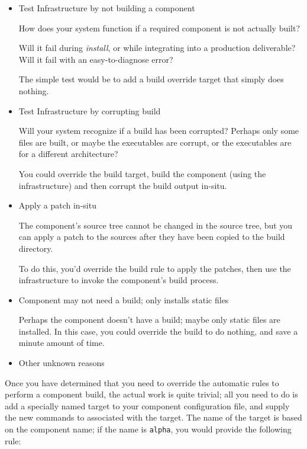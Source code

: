 \begin{itemize}
\item Test \bni Infrastructure by not building a component

  How does your \bni system function if a required component is not
  actually built?

  Will it fail during \emph{install}, or while integrating into a
  production deliverable?  Will it fail with an easy-to-diagnose
  error?

  The simple test would be to add a build override target that simply
  does nothing.

\item Test \bni Infrastructure by corrupting build

  Will your \bni system recognize if a build has been corrupted?
  Perhaps only some files are built, or maybe the executables are
  corrupt, or the executables are for a different architecture?

  You could override the build target, build the component (using the
  \lmsbw infrastructure) and then corrupt the build output in-situ.

\item Apply a patch in-situ

  The component's source tree cannot be changed in the source tree,
  but you can apply a patch to the sources after they have been copied
  to the build directory.

  To do this, you'd override the build rule to apply the patches, then
  use the \lmsbw infrastructure to invoke the component's build
  process.

\item Component may not need a build; only installs static files

  Perhaps the component doesn't have a build; maybe only static files
  are installed.  In this case, you could override the build to do
  nothing, and save a minute amount of time.

\item Other unknown reasons
\end{itemize}

Once you have determined that you need to override the automatic rules
to perform a component build, the actual work is quite trivial; all
you need to do is add a specially named \makefile target to your
component configuration file, and supply the new commands to
associated with the target.  The name of the target is based on the
component name; if the name is \texttt{alpha}, you would provide the
following rule:

